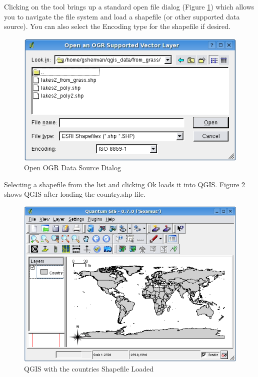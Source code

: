 Clicking on the tool brings up a standard open file dialog (Figure \ref{fig:openshapefile}) which allows you to navigate the file system and load a shapefile (or other supported data source). 
You can also select the Encoding type for the shapefile if desired.
\begin{figure}[h]
   \begin{center}
   \caption{Open OGR Data Source Dialog}\label{fig:openshapefile}\smallskip
   \includegraphics[scale=.75]{qgis_user_guide_images/shapefileopendialog}
\end{center}  
   
\end{figure}
Selecting a shapefile from the list and clicking Ok loads it into QGIS. Figure
\ref{fig:loadedshapefile} shows QGIS after loading the country.shp file.
\begin{figure}[h]
   \begin{center}
   \caption{QGIS with the countries Shapefile Loaded}\label{fig:loadedshapefile}\smallskip
   \includegraphics[scale=.7]{qgis_user_guide_images/shapefileloaded}
\end{center}  
   
\end{figure}
\begin{Tip}\caption{\textsc{Layer Colors}}
\end{Tip}


